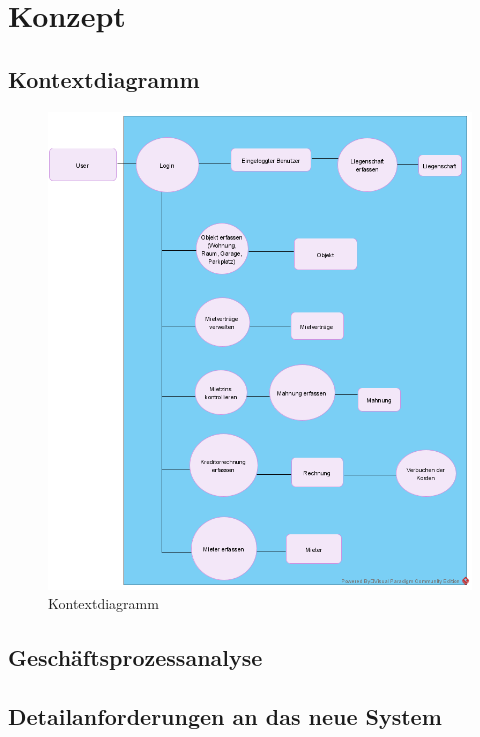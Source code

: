 \section{Konzept}

\subsection{Kontextdiagramm}
\begin{figure}[H]
  \begin{center}
    \includegraphics[width=0.99\linewidth]{content/diagrams/out/contextdiagram/context.png}
    \caption{Kontextdiagramm}
  \end{center}
\end{figure}

\subsection{Geschäftsprozessanalyse}
\subsection{Detailanforderungen an das neue System}
